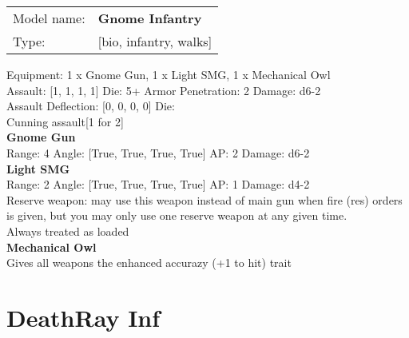  



\begin{tabular}{ll}
Model name: & {\bf Gnome Infantry } \\
Type: & [bio, infantry, walks] \\
\end{tabular}

Equipment: 1 x Gnome Gun, 1 x Light SMG, 1 x Mechanical Owl \\

Assault: [1, 1, 1, 1] Die: 5+ Armor Penetration: 2 Damage: d6-2 \\
Assault Deflection: [0, 0, 0, 0] Die: \\
\indent Cunning assault[1 for 2]\\ 
 



{\bf Gnome Gun } \\



Range: 4  Angle: [True, True, True, True] AP: 2 Damage: d6-2 \\




{\bf Light SMG } \\



Range: 2  Angle: [True, True, True, True] AP: 1 Damage: d4-2 \\
Reserve weapon: may use this weapon instead of main gun when fire (res) orders is given, but you may only use one reserve weapon at any given time.\\ 
Always treated as loaded\\ 




{\bf Mechanical Owl } \\

Gives all weapons the enhanced accurazy (+1 to hit) trait\\ 





 















\clearpage

\section{ DeathRay Inf }

